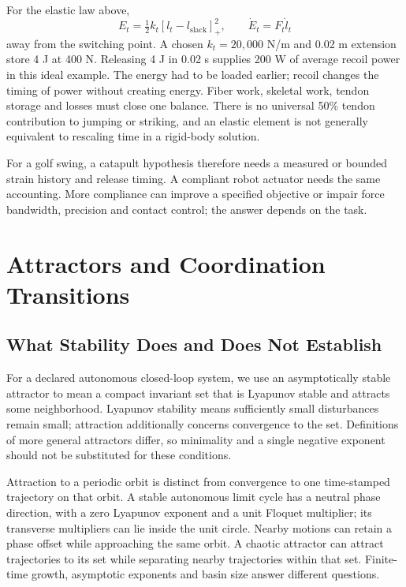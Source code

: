 For the elastic law above,
\begin{equation}
E_t=\tfrac12 k_t[l_t-l_{\mathrm{slack}}]_+^2,
\qquad \dot E_t=F_t\dot l_t
\label{eq:ch8:tendon-energy}
\end{equation}
away from the switching point. A chosen $k_t=20{,}000$ N/m and 0.02 m
extension store 4 J at 400 N. Releasing 4 J in 0.02 s supplies 200 W of average
recoil power in this ideal example. The energy had to be loaded earlier;
recoil changes the timing of power without creating energy. Fiber work,
skeletal work, tendon storage and losses must close one balance. There is no
universal 50\% tendon contribution to jumping or striking, and an elastic
element is not generally equivalent to rescaling time in a rigid-body solution.

For a golf swing, a catapult hypothesis therefore needs a measured or bounded
strain history and release timing. A compliant robot actuator needs the same
accounting. More compliance can improve a specified objective or impair force
bandwidth, precision and contact control; the answer depends on the task.

\section{Attractors and Coordination Transitions}

\subsection{What Stability Does and Does Not Establish}

For a declared autonomous closed-loop system, we use an asymptotically stable
attractor to mean a compact invariant set that is Lyapunov stable and attracts
some neighborhood. Lyapunov stability means sufficiently small disturbances
remain small; attraction additionally concerns convergence to the set.
Definitions of more general attractors differ, so minimality and a single
negative exponent should not be substituted for these conditions.

Attraction to a periodic orbit is distinct from convergence to one time-stamped
trajectory on that orbit. A stable autonomous limit cycle has a neutral phase
direction, with a zero Lyapunov exponent and a unit Floquet multiplier; its
transverse multipliers can lie inside the unit circle. Nearby motions can retain
a phase offset while approaching the same orbit. A chaotic attractor can attract
trajectories to its set while separating nearby trajectories within that set.
Finite-time growth, asymptotic exponents and basin size answer different questions.

